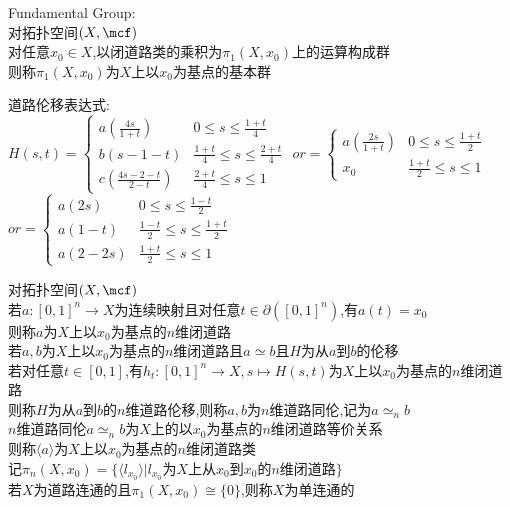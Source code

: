 \begin{dingli}
Fundamental Group:\\
对拓扑空间$(X,\mcf)$\\
对任意$x_0\in X$,以闭道路类的乘积为$\pi_1(X,x_0)$上的运算构成群\\
则称$\pi_1(X,x_0)$为$X$上以$x_0$为基点的基本群
\end{dingli}

\begin{zhu}
道路伦移表达式:\\
\footnotesize{
$H(s,t)=\begin{cases} a(\frac{4s}{1+t})&0 \leq s\leq\frac{1+t}{4}\\ b(s-1-t)&\frac{1+t}{4}\leq s\leq\frac{2+t}{4}\\ c(\frac{4s-2-t}{2-t})&\frac{2+t}{4}\leq s\leq1\end{cases}$
$or=\begin{cases} a(\frac{2s}{1+t})&0 \leq s\leq\frac{1+t}{2}\\ x_0&\frac{1+t}{2}\leq s\leq1\end{cases}$
$or=\begin{cases} a(2s)&0 \leq s\leq\frac{1-t}{2}\\ a(1-t)&\frac{1-t}{2}\leq s\leq\frac{1+t}{2}\\ a(2-2s)&\frac{1+t}{2}\leq s\leq1\end{cases}$}
\end{zhu}

\begin{dingyi}
对拓扑空间$(X,\mcf)$\\
若$a:[0,1]^n\to X$为连续映射且对任意$t\in\partial([0,1]^n)$,有$a(t)=x_0$\\
则称$a$为$X$上以$x_0$为基点的$n$维闭道路\\
若$a,b$为$X$上以$x_0$为基点的$n$维闭道路且$a\simeq b$且$H$为从$a$到$b$的伦移\\
若对任意$t\in[0,1]$,有$h_t:[0,1]^n\to X, s\mapsto H(s,t)$为$X$上以$x_0$为基点的$n$维闭道路\\
则称$H$为从$a$到$b$的$n$维道路伦移,则称$a,b$为$n$维道路同伦,记为$a\simeq_n b$\\
$n$维道路同伦$a\simeq_n b$为$X$上的以$x_0$为基点的$n$维闭道路等价关系\\
则称$\langle a\rangle$为$X$上以$x_0$为基点的$n$维闭道路类\\
记$\pi_n(X,x_0)=\{\langle l_{x_0}\rangle|l_{x_0}\text{为}X\text{上从}x_0\text{到}x_0\text{的}n\text{维闭道路}\}$\\
若$X$为道路连通的且$\pi_1(X,x_0)\cong\{0\}$,则称$X$为单连通的
\end{dingyi}

